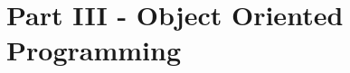\documentclass[12pt, openany, oneside]{book} %
\begin{document}



%
\pagestyle{empty} %
%
\tableofcontents %
%
%
\pagestyle{fancy} %



%
%
%
%
%
%
%
%
%
%


%

%

%

%

%

%

%

%

\part{Part III - Object Oriented Programming}



\end{document}
